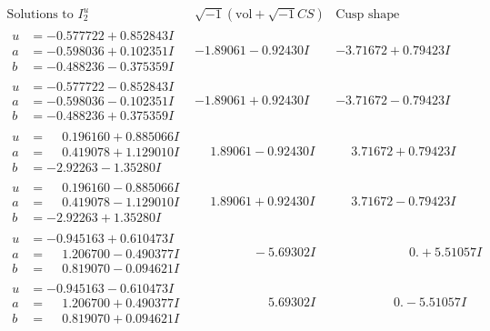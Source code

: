 \documentclass[1p]{elsarticle_modified}
\theoremstyle{definition}
\newcommand{\I}{\sqrt{-1}}
\begin{document}
$$\begin{array}{c|c|c}  
\text{Solutions to }I^u_{2}& \I (\text{vol} + \sqrt{-1}CS) & \text{Cusp shape}\\
 \hline 
\begin{aligned}
u &= -0.577722 + 0.852843 I \\
a &= -0.598036 + 0.102351 I \\
b &= -0.488236 - 0.375359 I\end{aligned}
 & -1.89061 - 0.92430 I & -3.71672 + 0.79423 I \\ \hline\begin{aligned}
u &= -0.577722 - 0.852843 I \\
a &= -0.598036 - 0.102351 I \\
b &= -0.488236 + 0.375359 I\end{aligned}
 & -1.89061 + 0.92430 I & -3.71672 - 0.79423 I \\ \hline\begin{aligned}
u &= \phantom{-}0.196160 + 0.885066 I \\
a &= \phantom{-}0.419078 + 1.129010 I \\
b &= -2.92263 - 1.35280 I\end{aligned}
 & \phantom{-}1.89061 - 0.92430 I & \phantom{-}3.71672 + 0.79423 I \\ \hline\begin{aligned}
u &= \phantom{-}0.196160 - 0.885066 I \\
a &= \phantom{-}0.419078 - 1.129010 I \\
b &= -2.92263 + 1.35280 I\end{aligned}
 & \phantom{-}1.89061 + 0.92430 I & \phantom{-}3.71672 - 0.79423 I \\ \hline\begin{aligned}
u &= -0.945163 + 0.610473 I \\
a &= \phantom{-}1.206700 - 0.490377 I \\
b &= \phantom{-}0.819070 - 0.094621 I\end{aligned}
 & \phantom{-0.000000 } -5.69302 I & \phantom{-0.000000 -}0. + 5.51057 I \\ \hline\begin{aligned}
u &= -0.945163 - 0.610473 I \\
a &= \phantom{-}1.206700 + 0.490377 I \\
b &= \phantom{-}0.819070 + 0.094621 I\end{aligned}
 & \phantom{-0.000000 -}5.69302 I & \phantom{-0.000000 } 0. - 5.51057 I \\ \hline\begin{aligned}

\end{aligned}
\end{array}$$
\end{document}
